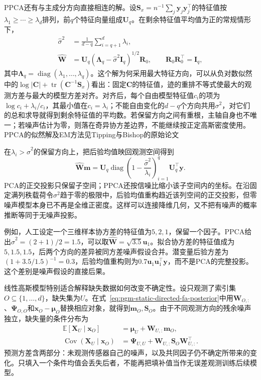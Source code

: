 PPCA还有与主成分方向直接相连的解。设$\bm{S}_{x}=n^{-1}\sum_j\bm{y}_j\bm{y}_j^\top$的特征值按$\lambda_1\ge\cdots\ge\lambda_d$排列，前$q$个特征向量组成$\bm{U}_q$。在剩余特征值平均值为正的常规情形下，
\begin{equation}
  \label{eq:pgm-static-directed-ppca-ml}
  \begin{aligned}
    \widehat{\sigma}^2
      &=\frac{1}{d-q}\sum_{i=q+1}^{d}\lambda_i,\\
    \widehat{\bm{W}}
      &=\bm{U}_q
       (\bm{\Lambda}_q-\widehat{\sigma}^2\bm{I}_q)^{1/2}
       \bm{R}_0,\qquad
       \bm{R}_0\bm{R}_0^\top=\bm{I}_q,
  \end{aligned}
\end{equation}
其中$\bm{\Lambda}_q=\operatorname{diag}(\lambda_1,\ldots,\lambda_q)$。这个解为何采用最大特征方向，可以从负对数似然中的$\log|\bm{C}|+\operatorname{tr}(\bm{C}^{-1}\bm{S}_x)$看出：固定$\bm{C}$的特征值，迹的重排不等式使最大的观测方差与最大的模型方差对齐。对齐后，每个自由模型特征值$c_i$的项为$\log c_i+\lambda_i/c_i$，其最小值在$c_i=\lambda_i$；不能自由变化的$d-q$个方向共用$\sigma^2$，对它们的总和求导就得到剩余特征值的平均数。若保留方向之间有重根，主轴自身也不唯一；若噪声估计为零，则落在奇异协方差边界，不能继续按正定高斯密度使用。PPCA的似然解及EM方法见Tipping与Bishop的原始论文

在$\lambda_i>\widehat{\sigma}^2$的保留方向上，把后验均值映回观测空间得到
\[
  \widehat{\bm{W}}\bm{m}
    =\bm{U}_q\operatorname{diag}
       \left(1-\frac{\widehat{\sigma}^2}{\lambda_i}\right)_{i=1}^{q}
       \bm{U}_q^\top\bm{y}.
\]
PCA的正交投影只保留子空间；PPCA还按信噪比缩小该子空间内的坐标。在沿固定满列秩载荷令$\sigma^2$趋于零的极限中，后验均值重构趋近该列空间的正交投影，但零噪声模型本身已不再是全维正密度。这样可以连接降维几何，又不把有噪声的概率推断等同于无噪声投影。

例如，人工设定一个三维样本协方差的特征值为$5,2,1$，保留一个因子。PPCA给出$\widehat{\sigma}^2=(2+1)/2=1.5$，可以取$\widehat{\bm{W}}=\sqrt{3.5}\bm{u}_1$。拟合协方差的特征值成为$5,1.5,1.5$，后两个方向的差异被同方差噪声假设合并。潜变量后验方差为$(1+3.5/1.5)^{-1}=0.3$，后验均值重构则为$0.7\bm{u}_1\bm{u}_1^\top\bm{y}$，而不是PCA的完整投影。这个差别是噪声假设的直接后果。

线性高斯模型特别适合解释缺失数据如何改变不确定性。设只观测了索引集$O\subseteq\{1,\ldots,d\}$，缺失集为$U$。在式~\eqref{eq:pgm-static-directed-fa-posterior}中用$\bm{W}_{O,:}$、$\bm{\Psi}_{O,O}$和$\bm{x}_O-\bm{\mu}_O$替换相应对象，就得到$\bm{m}_O,\bm{S}_O$。由于不同观测方向的残余噪声独立，缺失量的条件分布为
\begin{equation}
  \label{eq:pgm-static-directed-fa-missing}
  \begin{aligned}
    \mathbb{E}[\bm{X}_U\mid\bm{x}_O]
      &=\bm{\mu}_U+\bm{W}_{U,:}\bm{m}_O,\\
    \operatorname{Cov}(\bm{X}_U\mid\bm{x}_O)
      &=\bm{\Psi}_{U,U}
        +\bm{W}_{U,:}\bm{S}_O\bm{W}_{U,:}^\top.
  \end{aligned}
\end{equation}
预测方差含两部分：未观测传感器自己的噪声，以及共同因子仍不确定所带来的变化。只填入一个条件均值会丢失后者，不能再把填补值当作无误差观测训练后续模型。

